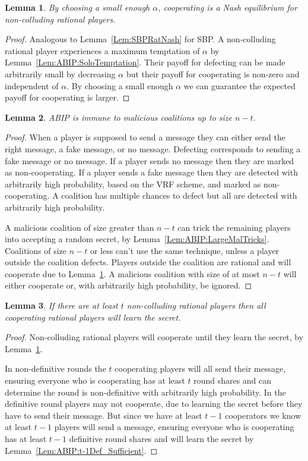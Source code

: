 \documentclass[12pt]{dalcsthesis}
\newtheorem{lemma}{Lemma}
\begin{document}
\begin{lemma}\label{Lem:ABIP:SoloNash}By choosing a small enough $\alpha$, cooperating is a Nash equilibrium for non-colluding rational players.\end{lemma}
\begin{proof}
Analogous to Lemma~\ref{Lem:SBPRatNash} for SBP. A non-colluding rational player experiences a maximum temptation of $\alpha$ by Lemma~\ref{Lem:ABIP:SoloTemptation}. Their payoff for defecting can be made arbitrarily small by decreasing $\alpha$ but their payoff for cooperating is non-zero and independent of $\alpha$. By choosing a small enough $\alpha$ we can guarantee the expected payoff for cooperating is larger.
\end{proof}

\begin{lemma}\label{Lem:ABIP:SmallMalImmune}ABIP is immune to malicious coalitions up to size $n-t$.\end{lemma}
\begin{proof}
When a player is supposed to send a message they can either send the right message, a fake message, or no message. Defecting corresponds to sending a fake message or no message. If a player sends no message then they are marked as non-cooperating. If a player sends a fake message then they are detected with arbitrarily high probability, based on the VRF scheme, and marked as non-cooperating. A coalition has multiple chances to defect but all are detected with arbitrarily high probability.

A malicious coalition of size greater than $n-t$ can trick the remaining players into accepting a random secret, by Lemma~\ref{Lem:ABIP:LargeMalTricks}. Coalitions of size $n-t$ or less can't use the same technique, unless a player outside the coalition defects. Players outside the coalition are rational and will cooperate due to Lemma~\ref{Lem:ABIP:SoloNash}. A malicious coalition with size of at most $n-t$ will either cooperate or, with arbitrarily high probability, be ignored.
\end{proof}

\begin{lemma}\label{Lem:ABIP:WorksForEnoughSoloRats}If there are at least $t$ non-colluding rational players then all cooperating rational players will learn the secret.\end{lemma}
\begin{proof}
Non-colluding rational players will cooperate until they learn the secret, by Lemma~\ref{Lem:ABIP:SoloNash}.

In non-definitive rounds the $t$ cooperating players will all send their message, ensuring everyone who is cooperating has at least $t$ round shares and can determine the round is non-definitive with arbitrarily high probability. In the definitive round players may not cooperate, due to learning the secret before they have to send their message. But since we have at least $t-1$ cooperators we know at least $t-1$ players will send a message, ensuring everyone who is cooperating has at least $t-1$ definitive round shares and will learn the secret by Lemma~\ref{Lem:ABIP:t-1Def_Sufficient}. 
\end{proof}
\end{document}

